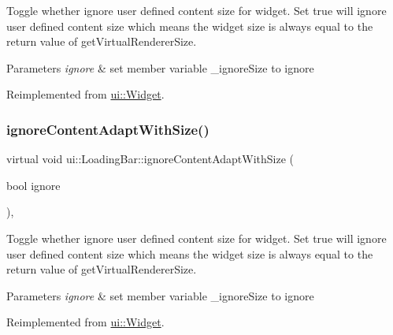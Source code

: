 Toggle whether ignore user defined content size for widget. Set true will ignore user defined content size which means the widget size is always equal to the return value of {\ttfamily get\+Virtual\+Renderer\+Size}.


\begin{DoxyParams}{Parameters}
{\em ignore} & set member variable \+\_\+ignore\+Size to ignore \\
\hline
\end{DoxyParams}


Reimplemented from \hyperlink{classui_1_1Widget_a47ec556e48f2ac20290c197e30434d36}{ui\+::\+Widget}.

\mbox{\label{classui_1_1LoadingBar_aef1d41416277666e74f953b072f54964}} 
\subsubsection{\texorpdfstring{ignore\+Content\+Adapt\+With\+Size()}{ignoreContentAdaptWithSize()}\hspace{0.1cm}{\footnotesize\ttfamily [2/2]}}
{\footnotesize\ttfamily virtual void ui\+::\+Loading\+Bar\+::ignore\+Content\+Adapt\+With\+Size (\begin{DoxyParamCaption}\item[{bool}]{ignore }\end{DoxyParamCaption})\hspace{0.3cm}{\ttfamily [override]}, {\ttfamily [virtual]}}

Toggle whether ignore user defined content size for widget. Set true will ignore user defined content size which means the widget size is always equal to the return value of {\ttfamily get\+Virtual\+Renderer\+Size}.


\begin{DoxyParams}{Parameters}
{\em ignore} & set member variable \+\_\+ignore\+Size to ignore \\
\hline
\end{DoxyParams}


Reimplemented from \hyperlink{classui_1_1Widget_a47ec556e48f2ac20290c197e30434d36}{ui\+::\+Widget}.

\mbox{\label{classui_1_1LoadingBar_ad7069c89d7947232a990799256ebabf2}} 
